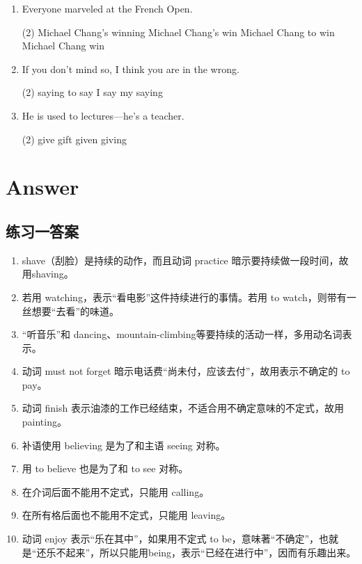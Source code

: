 \begin{enumerate}
\item Everyone marveled at \ttu the French Open.
  \begin{tasks}(2)
    \task Michael Chang's winning
    \task Michael Chang's win
    \task Michael Chang to win
    \task Michael Chang win
  \end{tasks}

\item If you don't mind \ttu so, I think you are in the wrong.
  \begin{tasks}(2)
    \task saying
    \task to say
    \task I say
    \task my saying
  \end{tasks}

\item He is used to \ttu lectures—he's a teacher.
  \begin{tasks}(2)
    \task give
    \task gift
    \task given
    \task giving
  \end{tasks}

\end{enumerate}

\section{Answer}
\subsection{练习一答案}
\begin{enumerate}
\item shave（刮脸）是持续的动作，而且动词 practice 暗示要持续做一段时间，故用shaving。
\item 若用 watching，表示“看电影”这件持续进行的事情。若用 to watch，则带有一丝想要“去看”的味道。
\item “听音乐”和 dancing、mountain-climbing等要持续的活动一样，多用动名词表示。
\item 动词 must not forget 暗示电话费“尚未付，应该去付”，故用表示不确定的 to pay。
\item 动词 finish 表示油漆的工作已经结束，不适合用不确定意味的不定式，故用painting。
\item 补语使用 believing 是为了和主语 seeing 对称。
\item 用 to believe 也是为了和 to see 对称。
\item 在介词后面不能用不定式，只能用 calling。
\item 在所有格后面也不能用不定式，只能用 leaving。
\item 动词 enjoy 表示“乐在其中”，如果用不定式 to be，意味著“不确定”，也就是“还乐不起来”，所以只能用being，表示“已经在进行中”，因而有乐趣出来。
\end{enumerate}

